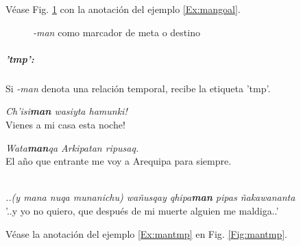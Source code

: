\documentclass[a4paper,11pt,DIV12]{scrartcl}
\begin{document}
 V\'ease Fig. \ref{Fig:mangoal} con la anotaci\'on del ejemplo \ref{Ex:mangoal}.

\begin{figure}
 \begin{center}
\caption{{\em -man} como marcador de meta o destino}\label{Fig:mangoal}
 \end{center}
\end{figure}



\subparagraph{'tmp':}

Si {\em -man} denota una relaci\'on temporal, recibe la etiqueta 'tmp'.

\begin{examples}
 \item {\em Ch'isi\textbf{man} wasiyta hamunki!}\\
       {\textexclamdown}Vienes a mi casa esta noche!
  \item {\em Wata\textbf{man}qa Arkipatan ripusaq.}\\
	El a\~no que entrante me voy a Arequipa para siempre.\\
 \hfill {\small \citep[124]{Cusi2}}\\
 \item\label{Ex:mantmp} {\em ..(y mana nuqa munanichu) wañusqay qhipa\textbf{man} pipas ñakawananta}\\
	'..y yo no quiero, que despu\'es de mi muerte alguien me maldiga..'\\
 \hfill {\small \citep{Valderrama77}}
\end{examples}



V\'ease la anotaci\'on del ejemplo \ref{Ex:mantmp} en Fig. \ref{Fig:mantmp}.
\end{document}
